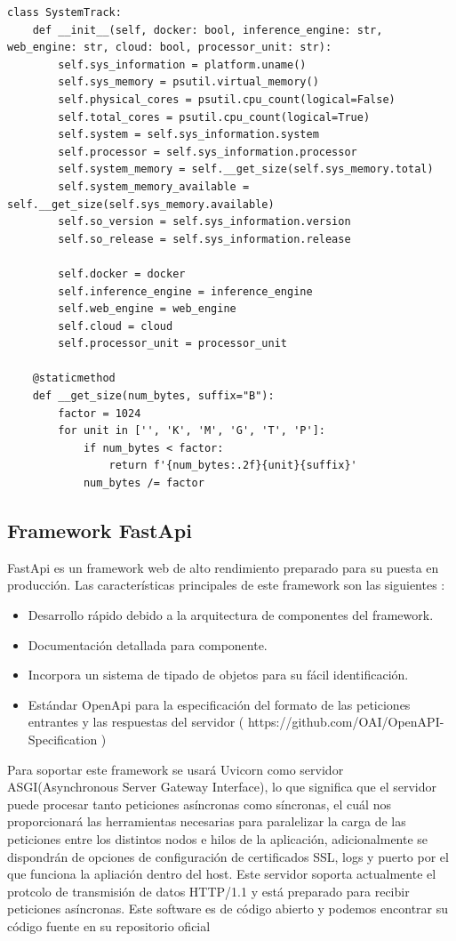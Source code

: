 \begin{lstlisting}[caption=Api, label=lst:system, float=t]
class SystemTrack:
    def __init__(self, docker: bool, inference_engine: str, web_engine: str, cloud: bool, processor_unit: str):
        self.sys_information = platform.uname()
        self.sys_memory = psutil.virtual_memory()
        self.physical_cores = psutil.cpu_count(logical=False)
        self.total_cores = psutil.cpu_count(logical=True)
        self.system = self.sys_information.system
        self.processor = self.sys_information.processor
        self.system_memory = self.__get_size(self.sys_memory.total)
        self.system_memory_available = self.__get_size(self.sys_memory.available)
        self.so_version = self.sys_information.version
        self.so_release = self.sys_information.release

        self.docker = docker
        self.inference_engine = inference_engine
        self.web_engine = web_engine
        self.cloud = cloud
        self.processor_unit = processor_unit

    @staticmethod
    def __get_size(num_bytes, suffix="B"):
        factor = 1024
        for unit in ['', 'K', 'M', 'G', 'T', 'P']:
            if num_bytes < factor:
                return f'{num_bytes:.2f}{unit}{suffix}'
            num_bytes /= factor
\end{lstlisting}
\subsection{Framework FastApi}\label{subsec:framework-fastapi}
FastApi es un framework web de alto rendimiento preparado para su puesta en producción.
Las características principales de este framework son las siguientes :
\begin{itemize}
    \item Desarrollo rápido debido a la arquitectura de componentes del framework.
    \item Documentación detallada para componente.
    \item Incorpora un sistema de tipado de objetos para su fácil identificación.
    \item Estándar OpenApi para la especificación del formato de las peticiones entrantes y las respuestas del servidor ( https://github.com/OAI/OpenAPI-Specification )
\end{itemize}
Para soportar este framework se usará Uvicorn como servidor ASGI(Asynchronous Server Gateway Interface), lo que significa que el servidor puede procesar tanto peticiones asíncronas como síncronas, el cuál nos proporcionará las herramientas necesarias para paralelizar la carga de las peticiones
entre los distintos nodos e hilos de la aplicación, adicionalmente se dispondrán de opciones de configuración de certificados SSL, logs y puerto por el que funciona la apliación dentro del host.
Este servidor soporta actualmente el protcolo de transmisión de datos HTTP/1.1 y está preparado para recibir peticiones asíncronas.
Este software es de código abierto y podemos encontrar su código fuente en su repositorio oficial

